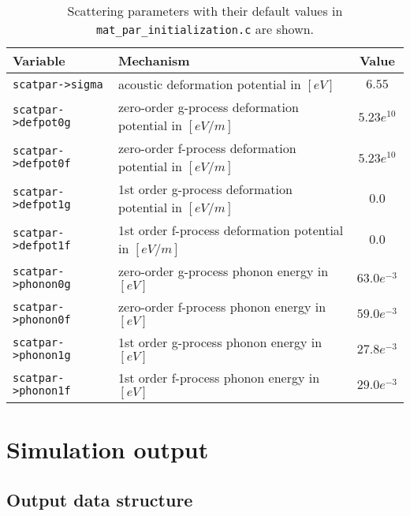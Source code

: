 \begin{table}[ht!]
\centering
\begin{tabular}{|l|p{8cm}|c|}
\hline
\textbf{Variable}          & \textbf{Mechanism}                                      & \textbf{Value} \\
\hline
\texttt{scatpar->sigma}    & acoustic deformation potential in $[eV]$                & $6.55$ \\
\hline
\texttt{scatpar->defpot0g} & zero-order g-process deformation potential in $[eV/m]$  & $5.23e^{10}$ \\
\hline
\texttt{scatpar->defpot0f} & zero-order f-process deformation potential in $[eV/m]$  & $5.23e^{10}$ \\
\hline
\texttt{scatpar->defpot1g} & 1st order g-process deformation potential in $[eV/m]$   & $0.0$ \\
\hline
\texttt{scatpar->defpot1f} & 1st order f-process deformation potential in $[eV/m]$   & $0.0$ \\
\hline
\texttt{scatpar->phonon0g} & zero-order g-process phonon energy in $[eV]$            & $63.0e^{-3}$ \\
\hline
\texttt{scatpar->phonon0f} & zero-order f-process phonon energy in $[eV]$            & $59.0e^{-3}$ \\
\hline
\texttt{scatpar->phonon1g} & 1st order g-process phonon energy in $[eV]$             & $27.8e^{-3}$ \\
\hline
\texttt{scatpar->phonon1f} & 1st order f-process phonon energy in $[eV]$             & $29.0e^{-3}$ \\
\hline
\end{tabular}
\caption{Scattering parameters with their default values in \texttt{mat\_par\_initialization.c} are shown.}
\label{tab:scatpar}
\end{table}


\section{Simulation output} \label{boltzmann:out}

\subsection{Output data structure}

